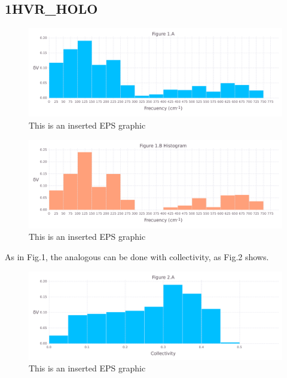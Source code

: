 \documentclass[10pt,letterpaper]{article}
\begin{document}
\FloatBarrier
\newpage

\subsection{1HVR\_HOLO}

\begin{figure}[ht]
\begin{center}
\includegraphics[scale=0.5]{1hvr_hol/1afigure_hi-precision.pdf}
\caption{This is an inserted EPS graphic}
\label{fig1}
\end{center}
\end{figure}

\begin{figure}[ht]
\begin{center}
\includegraphics[scale=0.5]{1hvr_hol/1bfigure_hi-precision.pdf}
\caption{This is an inserted EPS graphic}
\label{fig2}
\end{center}
\end{figure}

\clearpage
As in Fig.1, the analogous can be done with collectivity, as Fig.2 shows.

\begin{figure}[ht]
\begin{center}
\includegraphics[scale=0.5]{1hvr_hol/2afigure_hi-precision.pdf}
\caption{This is an inserted EPS graphic}
\label{fig3}
\end{center}
\end{figure}
\end{document}
